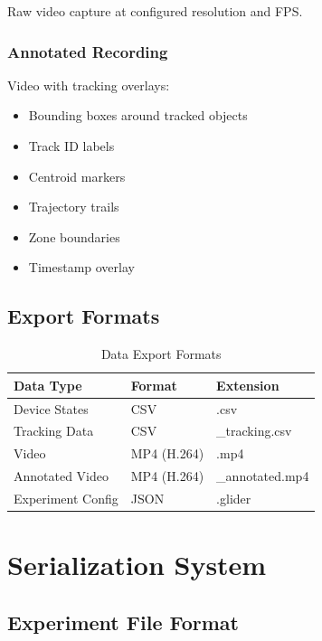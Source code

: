 \documentclass[11pt,a4paper]{article}
\begin{document}
Raw video capture at configured resolution and FPS.

\subsubsection{Annotated Recording}

Video with tracking overlays:
\begin{itemize}    \item Bounding boxes around tracked objects
    \item Track ID labels
    \item Centroid markers
    \item Trajectory trails
    \item Zone boundaries
    \item Timestamp overlay
\end{itemize}

\subsection{Export Formats}

\begin{table}[H]
\centering
\begin{tabular}{@{}lll@{}}
\toprule
\textbf{Data Type} & \textbf{Format} & \textbf{Extension} \\
\midrule
Device States & CSV & .csv \\
Tracking Data & CSV & \_tracking.csv \\
Video & MP4 (H.264) & .mp4 \\
Annotated Video & MP4 (H.264) & \_annotated.mp4 \\
Experiment Config & JSON & .glider \\
\bottomrule
\end{tabular}
\caption{Data Export Formats}
\end{table}

\section{Serialization System}

\subsection{Experiment File Format}
\end{document}
